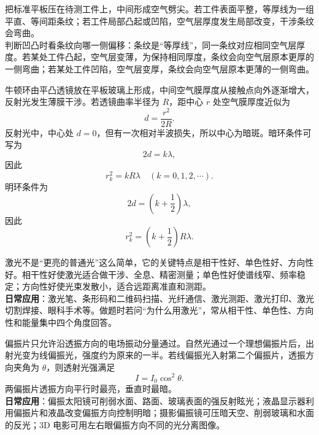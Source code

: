 \begin{casetypebox}[title={\strut\textcolor{white}{\bfseries 常见题型：劈尖检查工件平整度}}]
把标准平板压在待测工件上，中间形成空气劈尖。若工件表面平整，等厚线为一组平直、等间距条纹；若工件局部凸起或凹陷，空气层厚度发生局部改变，干涉条纹会弯曲。\\

判断凹凸时看条纹向哪一侧偏移：条纹是“等厚线”，同一条纹对应相同空气层厚度。若某处工件凸起，空气层变薄，为保持相同厚度，条纹会向空气层原本更厚的一侧弯曲；若某处工件凹陷，空气层变厚，条纹会向空气层原本更薄的一侧弯曲。
\end{casetypebox}

\begin{casetypebox}[title={\strut\textcolor{white}{\bfseries 常见题型：牛顿环}}]
牛顿环由平凸透镜放在平板玻璃上形成，中间空气膜厚度从接触点向外逐渐增大，反射光发生薄膜干涉。若透镜曲率半径为 $R$，距中心 $r$ 处空气膜厚度近似为
\[
  d=\frac{r^2}{2R}.
\]
反射光中，中心处 $d=0$，但有一次相对半波损失，所以中心为暗斑。暗环条件可写为
\[
  2d=k\lambda,
\]
因此
\[
  r_k^2=kR\lambda\quad(k=0,1,2,\cdots).
\]
明环条件为
\[
  2d=(k+\frac12)\lambda,
\]
因此
\[
  r_k^2=(k+\frac12)R\lambda.
\]
\end{casetypebox}

\begin{casetypebox}[title={\strut\textcolor{white}{\bfseries 常见题型：激光}}]
激光不是“更亮的普通光”这么简单，它的关键特点是相干性好、单色性好、方向性好。相干性好使激光适合做干涉、全息、精密测量；单色性好使谱线窄、频率稳定；方向性好使光束发散小，适合远距离准直和测距。\\

\textbf{日常应用}：激光笔、条形码和二维码扫描、光纤通信、激光测距、激光打印、激光切割焊接、眼科手术等。做题时若问“为什么用激光”，常从相干性、单色性、方向性和能量集中四个角度回答。
\end{casetypebox}

\begin{casetypebox}[title={\strut\textcolor{white}{\bfseries 常见题型：偏振片与马吕斯定律}}]
偏振片只允许沿透振方向的电场振动分量通过。自然光通过一个理想偏振片后，出射光变为线偏振光，强度约为原来的一半。若线偏振光入射第二个偏振片，透振方向夹角为 $\theta$，则透射光强满足
\[
  I=I_0\cos^2\theta.
\]
两偏振片透振方向平行时最亮，垂直时最暗。\\

\textbf{日常应用}：偏振太阳镜可削弱水面、路面、玻璃表面的强反射眩光；液晶显示器利用偏振片和液晶改变偏振方向控制明暗；摄影偏振镜可压暗天空、削弱玻璃和水面的反光；3D 电影可用左右眼偏振方向不同的光分离图像。
\end{casetypebox}

